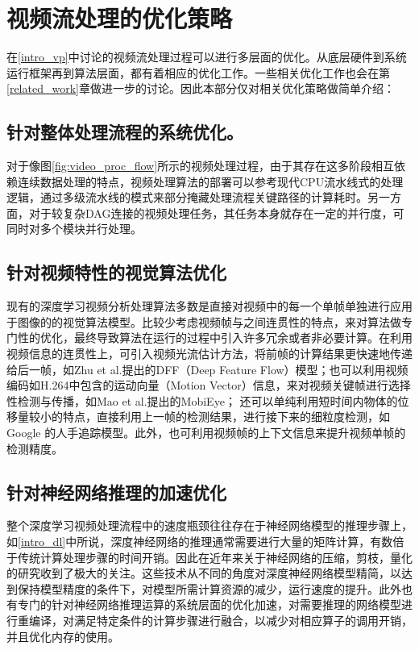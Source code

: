 \section{视频流处理的优化策略}\label{intro_opt}
在\ref{intro_vp}中讨论的视频流处理过程可以进行多层面的优化。从底层硬件到系统运行框架再到算法层面，都有着相应的优化工作。一些相关优化工作也会在第\ref{related_work}章做进一步的讨论。因此本部分仅对相关优化策略做简单介绍：\par

\subsection{针对整体处理流程的系统优化。}\label{sub:sys_opt}
对于像图\ref{fig:video_proc_flow}所示的视频处理过程，由于其存在这多阶段相互依赖连续数据处理的特点，视频处理算法的部署可以参考现代CPU流水线式的处理逻辑，通过多级流水线的模式来部分掩藏处理流程关键路径的计算耗时。另一方面，对于较复杂DAG连接的视频处理任务，其任务本身就存在一定的并行度，可同时对多个模块并行处理。
\subsection{针对视频特性的视觉算法优化}\label{sub:algo_opt}
现有的深度学习视频分析处理算法多数是直接对视频中的每一个单帧单独进行应用于图像的的视觉算法模型。比较少考虑视频帧与之间连贯性的特点，来对算法做专门性的优化，最终导致算法在运行的过程中引入许多冗余或者非必要计算。在利用视频信息的连贯性上，可引入视频光流估计方法，将前帧的计算结果更快速地传递给后一帧，如Zhu et al.提出的DFF（Deep Feature Flow）模型\cite{zhu2017deep}；也可以利用视频编码如H.264\cite{tourapis2003fast}中包含的运动向量（Motion Vector）信息，来对视频关键帧进行选择性检测与传播，如Mao et al.提出的MobiEye\cite{mao2019mobieye}；
还可以单纯利用短时间内物体的位移量较小的特点，直接利用上一帧的检测结果，进行接下来的细粒度检测，如Google 的人手追踪模型\cite{mediapipe_hand}。此外，也可利用视频帧的上下文信息来提升视频单帧的检测精度\cite{zhu2017flow}。
\subsection{针对神经网络推理的加速优化}\label{sub:infer_opt}
整个深度学习视频处理流程中的速度瓶颈往往存在于神经网络模型的推理步骤上，如\ref{intro_dl}中所说，深度神经网络的推理通常需要进行大量的矩阵计算，有数倍于传统计算处理步骤的时间开销。因此在近年来关于神经网络的压缩，剪枝，量化的研究收到了极大的关注。这些技术从不同的角度对深度神经网络模型精简，以达到保持模型精度的条件下，对模型所需计算资源的减少，运行速度的提升。此外也有专门的针对神经网络推理运算的系统层面的优化加速，对需要推理的网络模型进行重编译，对满足特定条件的计算步骤进行融合，以减少对相应算子的调用开销，并且优化内存的使用。

